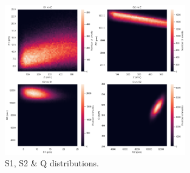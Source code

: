 \begin{frame}
\begin{figure}
  \begin{center}
      \includegraphics[width=0.7\textwidth]{img/r6581/s1s2q.png}
    \caption{S1, S2 \& Q distributions.}
  \end{center}
\end{figure}
\end{frame}

